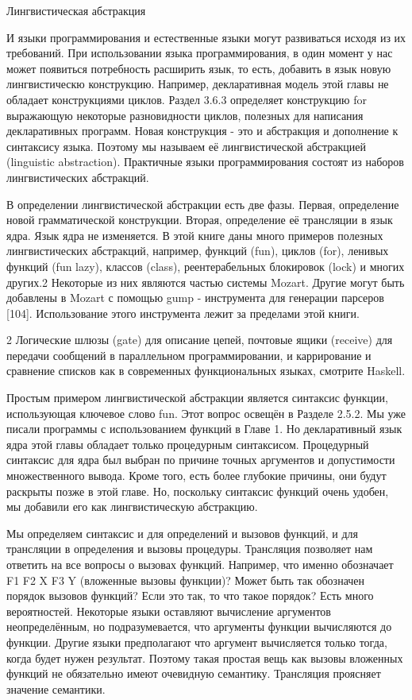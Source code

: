 Лингвистическая абстракция

И языки программирования и естественные языки могут развиваться исходя из их требований. При использовании языка программирования, в один момент у нас может появиться потребность расширить язык, то есть, добавить в язык новую лингвистическю конструкцию. Например, декларативная модель этой главы не обладает конструкциями циклов. Раздел 3.6.3 определяет конструкцию for выражающую некоторые разновидности циклов, полезных для написания декларативных программ. Новая конструкция - это и абстракция и дополнение к синтаксису языка. Поэтому мы называем её лингвистической абстракцией (linguistic abstraction). Практичные языки программирования состоят из наборов лингвистических абстракций.

В определении лингвистической абстракции есть две фазы. Первая, определение новой грамматической конструкции. Вторая, определение её трансляции в язык ядра. Язык ядра не изменяется. В этой книге даны много примеров полезных лингвистических абстракций, например, функций (fun), циклов (for), ленивых функций (fun lazy), классов (class), реентерабельных блокировок (lock) и многих других.2 Некоторые из них являются частью системы Mozart. Другие могут быть добавлены в Mozart с помощью gump - инструмента для генерации парсеров [104]. Использование этого инструмента лежит за пределами этой книги.

2 Логические шлюзы (gate) для описание цепей, почтовые ящики (receive) для передачи сообщений в параллельном программировании, и каррирование и сравнение списков как в современных функциональных языках, смотрите Haskell.

Простым примером лингвистической абстракции является синтаксис функции, использующая ключевое слово fun. Этот вопрос освещён в Разделе 2.5.2. Мы уже писали программы с использованием функций в Главе 1. Но декларативный язык ядра этой главы обладает только процедурным синтаксисом. Процедурный синтаксис для ядра был выбран по причине точных аргументов и допустимости множественного вывода. Кроме того, есть более глубокие причины, они будут раскрыты позже в этой главе. Но, поскольку синтаксис функций очень удобен, мы добавили его как лингвистическую абстракцию.

Мы определяем синтаксис и для определений и вызовов функций, и для трансляции в определения и вызовы процедуры. Трансляция позволяет нам ответить на все вопросы о вызовах функций. Например, что именно обозначает {F1 {F2 X} {F3 Y}} (вложенные вызовы функции)? Может быть так обозначен порядок вызовов функций? Если это так, то что такое порядок? Есть много вероятностей. Некоторые языки оставляют вычисление аргументов неопределённым, но подразумевается, что аргументы функции вычисляются до функции. Другие языки предполагают что аргумент вычисляется только тогда, когда будет нужен результат. Поэтому такая простая вещь как вызовы вложенных функций не обязательно имеют очевидную семантику. Трансляция проясняет значение семантики.

